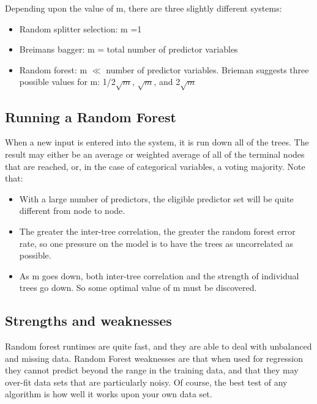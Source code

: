 Depending upon the value of m, there are three slightly different systems:
\begin{itemize}
\item Random splitter selection: m =1
\item Breiman\textsc{}s bagger: m = total number of predictor variables
\item Random forest: m $\ll$ number of predictor variables. Brieman suggests three possible values for m: 1/2$\sqrt{m}$, $\sqrt{m}$, and 2$\sqrt{m}$
\end{itemize}

\subsection*{Running a Random Forest} 
When a new input is entered into the system, it is run down all of the trees. The result may either be an average or weighted average of all of the terminal nodes that are reached, or, in the case of categorical variables, a voting majority.
Note that:
\begin{itemize}
\item With a large number of predictors, the eligible predictor set will be quite different from node to node.
\item The greater the inter-tree correlation, the greater the random forest error rate, so one pressure on the model is to have the trees as uncorrelated as possible.
\item As m goes down, both inter-tree correlation and the strength of individual trees go down. So some optimal value of m must be discovered.
\end{itemize}

\subsection*{Strengths and weaknesses}
Random forest runtimes are quite fast, and they are able to deal with unbalanced and missing data. Random Forest weaknesses are that when used for regression they cannot predict beyond the range in the training data, and that they may over-fit data sets that are particularly noisy. Of course, the best test of any algorithm is how well it works upon your own data set.
